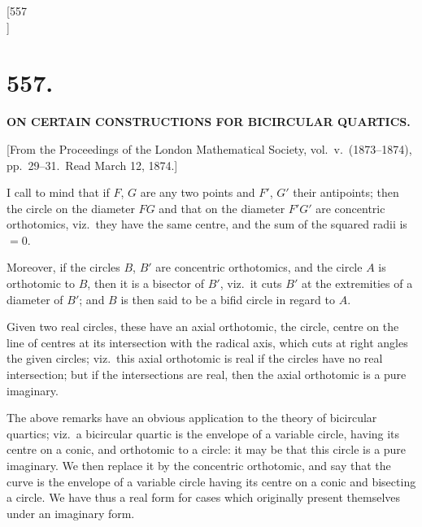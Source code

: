 \documentclass[12pt,a4paper]{article}
\theoremstyle{plain}
\theoremstyle{definition}
\begin{document}
\newpage
\setcounter{page}{13}

\begin{center}
[557\\
]
\end{center}

\section*{\textbf{557.}}

\begin{center}
{\large \textbf{ON CERTAIN CONSTRUCTIONS FOR BICIRCULAR QUARTICS.}}
\end{center}

\begin{flushright}
{\small [From the Proceedings of the London Mathematical Society, vol.\ v.\ (1873--1874), pp.\ 29--31.\ Read March 12, 1874.]}
\end{flushright}

I call to mind that if $F$, $G$ are any two points and $F'$, $G'$ their antipoints; then the circle on the diameter $FG$ and that on the diameter $F'G'$ are concentric orthotomics, viz.\ they have the same centre, and the sum of the squared radii is $= 0$.

Moreover, if the circles $B$, $B'$ are concentric orthotomics, and the circle $A$ is orthotomic to $B$, then it is a bisector of $B'$, viz.\ it cuts $B'$ at the extremities of a diameter of $B'$; and $B$ is then said to be a bifid circle in regard to $A$.

Given two real circles, these have an axial orthotomic, the circle, centre on the line of centres at its intersection with the radical axis, which cuts at right angles the given circles; viz.\ this axial orthotomic is real if the circles have no real intersection; but if the intersections are real, then the axial orthotomic is a pure imaginary.

The above remarks have an obvious application to the theory of bicircular quartics; viz.\ a bicircular quartic is the envelope of a variable circle, having its centre on a conic, and orthotomic to a circle: it may be that this circle is a pure imaginary. We then replace it by the concentric orthotomic, and say that the curve is the envelope of a variable circle having its centre on a conic and bisecting a circle. We have thus a real form for cases which originally present themselves under an imaginary form.
\end{document}
